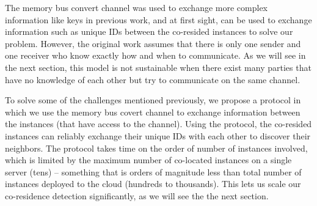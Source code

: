 The memory bus convert channel was used to exchange more complex
information like keys in previous work\cite{wuusenix2012}, and at first sight,
can be used to exchange information such as unique IDs between the co-resided instances
to solve our problem.  However, the original work assumes that there is only one
sender and one receiver who know exactly how and when to communicate. As we will
see in the next section, this model is not sustainable when there exist many
parties that have no knowledge of each other but try to communicate on the same
channel.

To solve some of the challenges mentioned previously, we propose a protocol in
which we use the memory bus covert channel to exchange information between 
the instances (that have access to the channel). Using the protocol, 
the co-resided instances can reliably exchange their unique IDs with each other to
discover their neighbors. The protocol
takes time on the order of number of instances involved, which is limited by the
maximum number of co-located instances on a single server (tens) -- something
that is orders of magnitude less than total number of instances deployed to the
cloud (hundreds to thousands).  This lets us scale our co-residence detection
significantly, as we will see the the next section.

